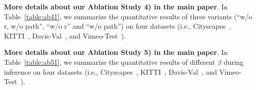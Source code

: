 \documentclass[10pt,twocolumn,letterpaper]{article}
\begin{document}
\noindent
\textbf{More details about our Ablation Study 4) in the main paper}.
In Table~\ref{table:ab41}, we summarize the quantitative results of three variants (``w/o r, w/o path'', ``w/o r'' and ``w/o path'') on four datasets (i.e., Cityscapes~\cite{cityscapes}, KITTI~\cite{kitti}, Davis-Val~\cite{davis}, and Vimeo-Test~\cite{vimeo}).
\begin{table*}[th]
\caption{\textbf{Spatial path is effective in DMVFN}. The evaluation metric is MS-SSIM ($\times10^{-2}$).}

\centering
{}
\label{table:ab41}
\end{table*}

\noindent
\textbf{More details about our Ablation Study 5) in the main paper}.
In Table~\ref{table:ab51}, we summarize the quantitative results of different $\beta$ during inference on four datasets (i.e., Cityscapes~\cite{cityscapes}, KITTI~\cite{kitti}, Davis-Val~\cite{davis}, and Vimeo-Test~\cite{vimeo}).
\end{document}
